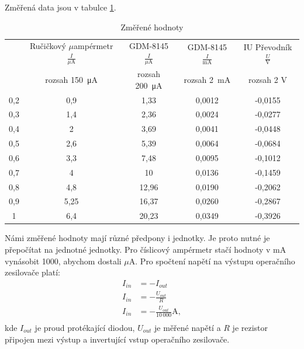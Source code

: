\documentclass[a4paper,12pt]{article}   %
\newcommand{\tmu}{$\mu$}
\begin{document}
Změřená data jsou v tabulce \ref{tab:zmereno}.
\begin{table}[h!]
    \centering
    \begin{tabular}{|c|c|c|c|c|}
        \hline
        \rule{0pt}{2.5ex}
        \multirow{2}{*}{Vstupní napětí $\frac{U}{\textrm{V}}$}& Ručičkový \tmu ampérmetr$\frac{I}{\mu\textrm{A}}$ 	&GDM-8145 $\frac{I}{\mu\textrm{A}}$	&GDM-8145 $\frac{I}{\textrm{mA}}$	&IU Převodník $\frac{U}{\textrm{V}}$  \\[.7ex]
        & rozsah  150~μA & rozsah 200~μA & rozsah  2~mA & rozsah  2 V\\\hline\hline
        0,2 &0,9    &1,33   &0,0012 &-0,0155     \\\hline
        0,3 &1,4    &2,36   &0,0024 &-0,0277     \\\hline
        0,4 &2      &3,69   &0,0041 &-0,0448       \\\hline
        0,5 &2,6    &5,39   &0,0064 &-0,0684     \\\hline
        0,6 &3,3    &7,48   &0,0095 &-0,1012     \\\hline
        0,7 &4      &10     &0,0136 &-0,1459         \\\hline
        0,8 &4,8    &12,96  &0,0190 &-0,2062    \\\hline
        0,9 &5,25   &16,37  &0,0260 &-0,2867   \\\hline
        1   &6,4    &20,23  &0,0349 &-0,3926      \\\hline
    
    \end{tabular}
    \caption{Změřené hodnoty}
    \label{tab:zmereno}
\end{table}

Námi změřené hodnoty mají různé předpony i jednotky. Je proto nutné je přepočítat na jednotné jednotky. Pro číslicový ampérmetr stačí hodnoty v mA vynásobit 1000, abychom dostali \tmu A. Pro spočtení napětí na výstupu operačního zesilovače platí:
\begin{equation}
    \begin{split}
        I_{in}&=-I_{out}\\
        I_{in}&=-\frac{U_{out}}{R}\\
        I_{in}&=-\frac{U_{out}}{10\,000} \textrm{A},\\
    \end{split}
    \label{eq:iu}
\end{equation}
kde $I_{out}$ je proud protékající diodou, $U_{out}$ je měřené napětí a $R$ je rezistor připojen mezi výstup a invertující vstup operačního zesilovače.
\end{document}
